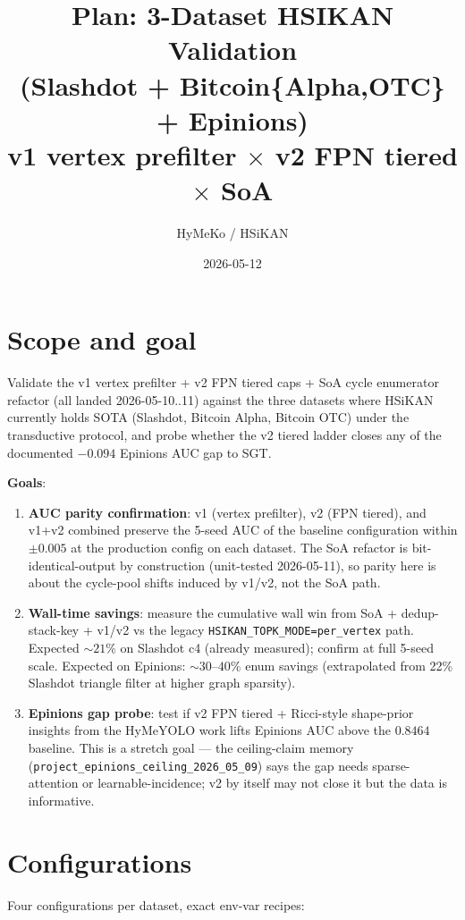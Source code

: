 \documentclass[11pt,a4paper]{article}
\title{Plan: 3-Dataset HSIKAN Validation\\
       (Slashdot + Bitcoin\{Alpha,OTC\} + Epinions)\\
       v1 vertex prefilter $\times$ v2 FPN tiered $\times$ SoA}
\author{HyMeKo / HSiKAN}
\date{2026-05-12}
\begin{document}
\maketitle

\section{Scope and goal}
Validate the v1 vertex prefilter + v2 FPN tiered caps + SoA cycle
enumerator refactor (all landed 2026-05-10..11) against the three
datasets where HSiKAN currently holds SOTA (Slashdot, Bitcoin Alpha,
Bitcoin OTC) under the transductive protocol, and probe whether the
v2 tiered ladder closes any of the documented $-0.094$ Epinions AUC
gap to SGT.

\textbf{Goals}:
\begin{enumerate}
\item \textbf{AUC parity confirmation}: v1 (vertex prefilter), v2
  (FPN tiered), and v1+v2 combined preserve the 5-seed AUC of the
  baseline configuration within $\pm 0.005$ at the production config
  on each dataset.  The SoA refactor is bit-identical-output by
  construction (unit-tested 2026-05-11), so parity here is about
  the cycle-pool shifts induced by v1/v2, not the SoA path.
\item \textbf{Wall-time savings}: measure the cumulative wall win
  from SoA + dedup-stack-key + v1/v2 vs the legacy
  \texttt{HSIKAN\_TOPK\_MODE=per\_vertex} path.  Expected
  $\sim 21\%$ on Slashdot c4 (already measured); confirm at full
  5-seed scale.  Expected on Epinions: $\sim 30$--$40\%$ enum
  savings (extrapolated from 22\% Slashdot triangle filter at higher
  graph sparsity).
\item \textbf{Epinions gap probe}: test if v2 FPN tiered + Ricci-style
  shape-prior insights from the HyMeYOLO work lifts Epinions AUC
  above the $0.8464$ baseline.  This is a stretch goal --- the
  ceiling-claim memory
  (\texttt{project\_epinions\_ceiling\_2026\_05\_09}) says the gap
  needs sparse-attention or learnable-incidence; v2 by itself may
  not close it but the data is informative.
\end{enumerate}

\section{Configurations}

Four configurations per dataset, exact env-var recipes:
\end{document}
